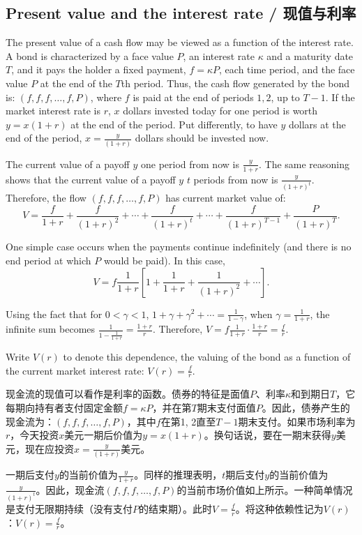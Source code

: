\subsection{Present value and the interest rate / 现值与利率}

\begin{original}
The present value of a cash flow may be viewed as a function of the interest rate. A bond is characterized by a face value $P$, an interest rate $\kappa$ and a maturity date $T$, and it pays the holder a fixed payment, $f = \kappa P$, each time period, and the face value $P$ at the end of the $T$th period. Thus, the cash flow generated by the bond is: $(f, f, f, \ldots, f, P)$, where $f$ is paid at the end of periods $1, 2$, up to $T - 1$. If the market interest rate is $r$, $x$ dollars invested today for one period is worth $y = x(1 + r)$ at the end of the period. Put differently, to have $y$ dollars at the end of the period, $x = \frac{y}{(1+r)}$ dollars should be invested now.

The current value of a payoff $y$ one period from now is $\frac{y}{1+r}$. The same reasoning shows that the current value of a payoff $y$ $t$ periods from now is $\frac{y}{(1+r)^t}$. Therefore, the flow $(f, f, f, \ldots, f, P)$ has current market value of:
\[
V = \frac{f}{1+r} + \frac{f}{(1+r)^2} + \cdots + \frac{f}{(1+r)^t} + \cdots + \frac{f}{(1+r)^{T-1}} + \frac{P}{(1+r)^T}.
\]

One simple case occurs when the payments continue indefinitely (and there is no end period at which $P$ would be paid). In this case,
\[
V = f \frac{1}{1+r} \left[1 + \frac{1}{1+r} + \frac{1}{(1+r)^2} + \cdots \right].
\]

Using the fact that for $0 < \gamma < 1$, $1 + \gamma + \gamma^2 + \cdots = \frac{1}{1-\gamma}$, when $\gamma = \frac{1}{1+r}$, the infinite sum becomes $\frac{1}{1-\frac{1}{1+r}} = \frac{1+r}{r}$. Therefore, $V = f \frac{1}{1+r} \cdot \frac{1+r}{r} = \frac{f}{r}$.

Write $V(r)$ to denote this dependence, the valuing of the bond as a function of the current market interest rate: $V(r) = \frac{f}{r}$.
\end{original}
\begin{translation}
现金流的现值可以看作是利率的函数。债券的特征是面值$P$、利率$\kappa$和到期日$T$，它每期向持有者支付固定金额$f = \kappa P$，并在第$T$期末支付面值$P$。因此，债券产生的现金流为：$(f, f, f, \ldots, f, P)$，其中$f$在第1, 2直至$T-1$期末支付。如果市场利率为$r$，今天投资$x$美元一期后价值为$y = x(1 + r)$。换句话说，要在一期末获得$y$美元，现在应投资$x = \frac{y}{(1+r)}$美元。

一期后支付$y$的当前价值为$\frac{y}{1+r}$。同样的推理表明，$t$期后支付$y$的当前价值为$\frac{y}{(1+r)^t}$。因此，现金流$(f, f, f, \ldots, f, P)$的当前市场价值如上所示。一种简单情况是支付无限期持续（没有支付$P$的结束期）。此时$V = \frac{f}{r}$。将这种依赖性记为$V(r)$：$V(r) = \frac{f}{r}$。
\end{translation}

